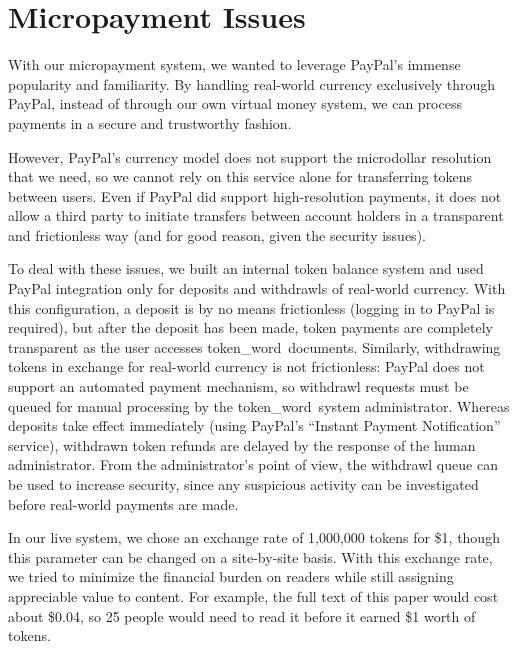 \documentclass{acm_proc_article-sp}
\newcommand{\tokenWord}{token\_word}
\begin{document}


\section{Micropayment Issues}
With our micropayment system, we wanted to leverage PayPal's \cite{paypal} immense popularity and familiarity.
By handling real-world currency exclusively through PayPal, instead of through our own virtual money system, we can process payments in a secure and trustworthy fashion.

However, PayPal's currency model does not support the microdollar resolution that we need, so we cannot rely on this service alone for transferring tokens between users.
Even if PayPal did support high-resolution payments, it does not allow a third party to initiate transfers between account holders in a transparent and frictionless way (and for good reason, given the security issues).

To deal with these issues, we built an internal token balance system and used PayPal integration only for deposits and withdrawls of real-world currency.
With this configuration, a deposit is by no means frictionless (logging in to PayPal is required), but after the deposit has been made, token payments are completely transparent as the user accesses \tokenWord \  documents.
Similarly, withdrawing tokens in exchange for real-world currency is not frictionless: 
PayPal does not support an automated payment mechanism, so withdrawl requests must be queued for manual processing by the \tokenWord \  system administrator.
Whereas deposits take effect immediately (using PayPal's ``Instant Payment Notification'' service), withdrawn token refunds are delayed by the response of the human administrator.
From the administrator's point of view, the withdrawl queue can be used to increase security, since any suspicious activity can be investigated before real-world payments are made.  

In our live system, we chose an exchange rate of 1,000,000 tokens for \$1, though this parameter can be changed on a site-by-site basis.
With this exchange rate, we tried to minimize the financial burden on readers while still assigning appreciable value to content.
For example, the full text of this paper would cost about \$0.04, so 25 people would need to read it before it earned \$1 worth of tokens.
\end{document}
